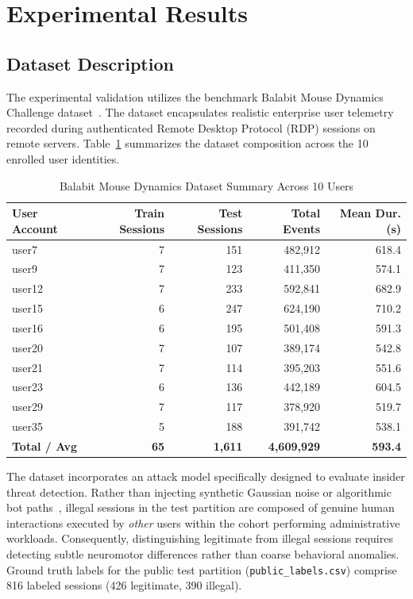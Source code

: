 \documentclass[10pt,journal,compsoc]{IEEEtran}
\begin{document}
\section{Experimental Results}

\subsection{Dataset Description}
The experimental validation utilizes the benchmark Balabit Mouse Dynamics Challenge dataset~\cite{balabit2016dataset, hinbarji2021comprehensive}. The dataset encapsulates realistic enterprise user telemetry recorded during authenticated Remote Desktop Protocol (RDP) sessions on remote servers. Table~\ref{tab:dataset_summary} summarizes the dataset composition across the 10 enrolled user identities.

\begin{table}[!ht]
\centering
\caption{Balabit Mouse Dynamics Dataset Summary Across 10 Users}
\label{tab:dataset_summary}
\begin{tabular}{@{}lrrrr@{}}
\toprule
\textbf{User Account} & \textbf{Train Sessions} & \textbf{Test Sessions} & \textbf{Total Events} & \textbf{Mean Dur. (s)} \\
\midrule
user7  & 7 & 151 & 482,912 & 618.4 \\
user9  & 7 & 123 & 411,350 & 574.1 \\
user12 & 7 & 233 & 592,841 & 682.9 \\
user15 & 6 & 247 & 624,190 & 710.2 \\
user16 & 6 & 195 & 501,408 & 591.3 \\
user20 & 7 & 107 & 389,174 & 542.8 \\
user21 & 7 & 114 & 395,203 & 551.6 \\
user23 & 6 & 136 & 442,189 & 604.5 \\
user29 & 7 & 117 & 378,920 & 519.7 \\
user35 & 5 & 188 & 391,742 & 538.1 \\
\midrule
\textbf{Total / Avg} & \textbf{65} & \textbf{1,611} & \textbf{4,609,929} & \textbf{593.4} \\
\bottomrule
\end{tabular}
\end{table}

The dataset incorporates an attack model specifically designed to evaluate insider threat detection. Rather than injecting synthetic Gaussian noise or algorithmic bot paths~\cite{ouyang2023evading}, illegal sessions in the test partition are composed of genuine human interactions executed by \textit{other} users within the cohort performing administrative workloads. Consequently, distinguishing legitimate from illegal sessions requires detecting subtle neuromotor differences rather than coarse behavioral anomalies. Ground truth labels for the public test partition (\texttt{public\_labels.csv}) comprise 816 labeled sessions (426 legitimate, 390 illegal).
\end{document}
